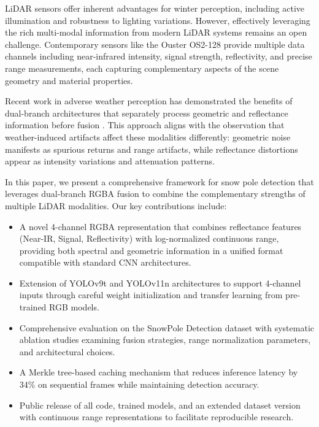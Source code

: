 \documentclass[runningheads]{llncs}
\begin{document}
LiDAR sensors offer inherent advantages for winter perception, including active illumination and robustness to lighting variations. However, effectively leveraging the rich multi-modal information from modern LiDAR systems remains an open challenge. Contemporary sensors like the Ouster OS2-128 provide multiple data channels including near-infrared intensity, signal strength, reflectivity, and precise range measurements, each capturing complementary aspects of the scene geometry and material properties.

Recent work in adverse weather perception has demonstrated the benefits of dual-branch architectures that separately process geometric and reflectance information before fusion \cite{yang2025towards}. This approach aligns with the observation that weather-induced artifacts affect these modalities differently: geometric noise manifests as spurious returns and range artifacts, while reflectance distortions appear as intensity variations and attenuation patterns.

In this paper, we present a comprehensive framework for snow pole detection that leverages dual-branch RGBA fusion to combine the complementary strengths of multiple LiDAR modalities. Our key contributions include:

\begin{itemize}
    \item A novel 4-channel RGBA representation that combines reflectance features (Near-IR, Signal, Reflectivity) with log-normalized continuous range, providing both spectral and geometric information in a unified format compatible with standard CNN architectures.
    
    \item Extension of YOLOv9t and YOLOv11n architectures to support 4-channel inputs through careful weight initialization and transfer learning from pre-trained RGB models.
    
    \item Comprehensive evaluation on the SnowPole Detection dataset with systematic ablation studies examining fusion strategies, range normalization parameters, and architectural choices.
    
    \item A Merkle tree-based caching mechanism that reduces inference latency by 34\% on sequential frames while maintaining detection accuracy.
    
    \item Public release of all code, trained models, and an extended dataset version with continuous range representations to facilitate reproducible research.
\end{itemize}
\end{document}
